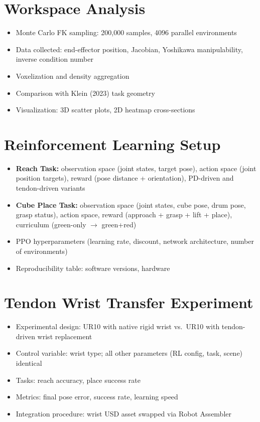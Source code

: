 \section{Workspace Analysis}
\begin{itemize}
    \item Monte Carlo FK sampling: 200,000 samples, 4096 parallel environments
    \item Data collected: end-effector position, Jacobian, Yoshikawa manipulability, inverse condition number
    \item Voxelization and density aggregation
    \item Comparison with Klein (2023) task geometry
    \item Visualization: 3D scatter plots, 2D heatmap cross-sections
\end{itemize}

\section{Reinforcement Learning Setup}
\begin{itemize}
    \item \textbf{Reach Task:} observation space (joint states, target pose), action space (joint position targets), reward (pose distance + orientation), PD-driven and tendon-driven variants
    \item \textbf{Cube Place Task:} observation space (joint states, cube pose, drum pose, grasp status), action space, reward (approach + grasp + lift + place), curriculum (green-only $\rightarrow$ green+red)
    \item PPO hyperparameters (learning rate, discount, network architecture, number of environments)
    \item Reproducibility table: software versions, hardware
\end{itemize}

\section{Tendon Wrist Transfer Experiment}
\begin{itemize}
    \item Experimental design: UR10 with native rigid wrist vs.\ UR10 with tendon-driven wrist replacement
    \item Control variable: wrist type; all other parameters (RL config, task, scene) identical
    \item Tasks: reach accuracy, place success rate
    \item Metrics: final pose error, success rate, learning speed
    \item Integration procedure: wrist USD asset swapped via Robot Assembler
\end{itemize}

